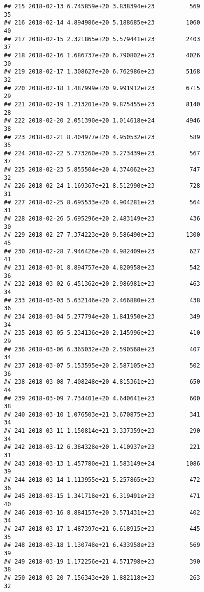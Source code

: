 \documentclass[]{article}
\begin{document}
\begin{verbatim}
## 215 2018-02-13 6.745859e+20 3.838394e+23          569              35
## 216 2018-02-14 4.894986e+20 5.188685e+23         1060              40
## 217 2018-02-15 2.321865e+20 5.579441e+23         2403              37
## 218 2018-02-16 1.686737e+20 6.790802e+23         4026              30
## 219 2018-02-17 1.308627e+20 6.762986e+23         5168              32
## 220 2018-02-18 1.487999e+20 9.991912e+23         6715              29
## 221 2018-02-19 1.213201e+20 9.875455e+23         8140              28
## 222 2018-02-20 2.051390e+20 1.014618e+24         4946              38
## 223 2018-02-21 8.404977e+20 4.950532e+23          589              35
## 224 2018-02-22 5.773260e+20 3.273439e+23          567              37
## 225 2018-02-23 5.855504e+20 4.374062e+23          747              32
## 226 2018-02-24 1.169367e+21 8.512990e+23          728              31
## 227 2018-02-25 8.695533e+20 4.904281e+23          564              31
## 228 2018-02-26 5.695296e+20 2.483149e+23          436              30
## 229 2018-02-27 7.374223e+20 9.586490e+23         1300              45
## 230 2018-02-28 7.946426e+20 4.982409e+23          627              41
## 231 2018-03-01 8.894757e+20 4.820958e+23          542              36
## 232 2018-03-02 6.451362e+20 2.986981e+23          463              34
## 233 2018-03-03 5.632146e+20 2.466880e+23          438              36
## 234 2018-03-04 5.277794e+20 1.841950e+23          349              34
## 235 2018-03-05 5.234136e+20 2.145996e+23          410              29
## 236 2018-03-06 6.365032e+20 2.590568e+23          407              34
## 237 2018-03-07 5.153595e+20 2.587105e+23          502              36
## 238 2018-03-08 7.408248e+20 4.815361e+23          650              44
## 239 2018-03-09 7.734401e+20 4.640641e+23          600              38
## 240 2018-03-10 1.076503e+21 3.670875e+23          341              34
## 241 2018-03-11 1.150814e+21 3.337359e+23          290              34
## 242 2018-03-12 6.384328e+20 1.410937e+23          221              31
## 243 2018-03-13 1.457780e+21 1.583149e+24         1086              39
## 244 2018-03-14 1.113955e+21 5.257865e+23          472              36
## 245 2018-03-15 1.341718e+21 6.319491e+23          471              40
## 246 2018-03-16 8.884157e+20 3.571431e+23          402              34
## 247 2018-03-17 1.487397e+21 6.618915e+23          445              35
## 248 2018-03-18 1.130748e+21 6.433958e+23          569              39
## 249 2018-03-19 1.172256e+21 4.571798e+23          390              38
## 250 2018-03-20 7.156343e+20 1.882118e+23          263              32

\end{verbatim}
\end{document}
